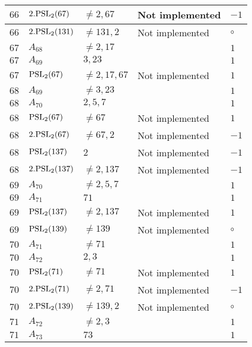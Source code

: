 \documentclass[a4paper, 11pt]{article}
\begin{document}
\begin{longtable}{lllll}
        $ 66 $ & $ 2.{\rm PSL}_{2}(67) $ & $ \neq 2, 67 $ & Not implemented & $ -1  $ \\ \hline
        $ 66 $ & $ 2.{\rm PSL}_{2}(131) $ & $ \neq 131, 2 $ & Not implemented & $\circ$ \\ \hline
        $ 67 $ & $ A_{68} $ & $ \neq 2, 17 $ & $ ~ $ & $ 1  $ \\ \hline
        $ 67 $ & $ A_{69} $ & $ 3, 23 $ & $ ~ $ & $ 1  $ \\ \hline
        $ 67 $ & $ {\rm PSL}_{2}(67) $ & $ \neq 2, 17, 67 $ & Not implemented & $ 1  $ \\ \hline
        $ 68 $ & $ A_{69} $ & $ \neq 3, 23 $ & $ ~ $ & $ 1  $ \\ \hline
        $ 68 $ & $ A_{70} $ & $ 2, 5, 7 $ & $ ~ $ & $ 1  $ \\ \hline
        $ 68 $ & $ {\rm PSL}_{2}(67) $ & $ \neq 67 $ & Not implemented & $ 1  $ \\ \hline
        $ 68 $ & $ 2.{\rm PSL}_{2}(67) $ & $ \neq 67, 2 $ & Not implemented & $ -1  $ \\ \hline
        $ 68 $ & $ {\rm PSL}_{2}(137) $ & $ 2 $ & Not implemented & $ -1  $ \\ \hline
        $ 68 $ & $ 2.{\rm PSL}_{2}(137) $ & $ \neq 2, 137 $ & Not implemented & $ -1  $ \\ \hline
        $ 69 $ & $ A_{70} $ & $ \neq 2, 5, 7 $ & $ ~ $ & $ 1  $ \\ \hline
        $ 69 $ & $ A_{71} $ & $ 71 $ & $ ~ $ & $ 1  $ \\ \hline
        $ 69 $ & $ {\rm PSL}_{2}(137) $ & $ \neq 2, 137 $ & Not implemented & $ 1  $ \\ \hline
        $ 69 $ & $ {\rm PSL}_{2}(139) $ & $ \neq 139 $ & Not implemented & $\circ$ \\ \hline
        $ 70 $ & $ A_{71} $ & $ \neq 71 $ & $ ~ $ & $ 1  $ \\ \hline
        $ 70 $ & $ A_{72} $ & $ 2, 3 $ & $ ~ $ & $ 1  $ \\ \hline
        $ 70 $ & $ {\rm PSL}_{2}(71) $ & $ \neq 71 $ & Not implemented & $ 1  $ \\ \hline
        $ 70 $ & $ 2.{\rm PSL}_{2}(71) $ & $ \neq 2, 71 $ & Not implemented & $ -1  $ \\ \hline
        $ 70 $ & $ 2.{\rm PSL}_{2}(139) $ & $ \neq 139, 2 $ & Not implemented & $\circ$ \\ \hline
        $ 71 $ & $ A_{72} $ & $ \neq 2, 3 $ & $ ~ $ & $ 1  $ \\ \hline
        $ 71 $ & $ A_{73} $ & $ 73 $ & $ ~ $ & $ 1  $ \\ \hline

\end{longtable}
\end{document}

